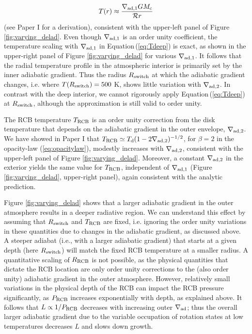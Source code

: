 \documentclass[apj]{emulateapj}
\newcommand{\Eq}[1]{Equation\,(\ref{#1})}
\newcommand{\co}{_{\rm c}}
\newcommand{\di}{_{\rm d}}
\newcommand{\cb}{_{\rm RCB}}
\begin{document}
\begin{equation}
\label{eq:Tdeep}
T(r) \approx \frac{\nabla_{\rm ad,1} G M\co}{\mathcal{R} r}
\end{equation}   
(see Paper I for a derivation), consistent with the upper-left panel of Figure \ref{fig:varying_delad}. Even though $\nabla_{\rm ad,1}$ is an order unity coefficient, the temperature scaling with $\nabla_{\rm ad,1}$ in \Eq{eq:Tdeep} is exact, as shown in the upper-right panel of Figure \ref{fig:varying_delad} for various $\nabla_{\rm ad,1}$. It follows that the radial temperature profile in the atmospheric interior is primarily set by the inner adiabatic gradient. Thus the radius $R_{\rm switch}$ at which the adiabatic gradient changes, i.e. where $T(R_{\rm switch})=500$ K, shows little variation with $\nabla_{\rm ad,2}$. In contrast with the deep interior, we cannot rigorously apply \Eq{eq:Tdeep} at $R_{\rm switch}$, although the approximation is still valid to order unity.

The RCB temperature $T\cb$ is an order unity correction from the disk temperature that depends on the adiabatic gradient in the outer envelope, $\nabla_{\rm ad,2}$.  We have showed in Paper I that $T\cb \simeq T\di (1- 2 \nabla_{\rm ad, 2})^{-1/2}$, for $\beta=2$ in the opacity-law (\ref{eq:opacitylaw}), modestly increases with $\nabla_{\rm ad,2}$, consistent with the upper-left panel of Figure \ref{fig:varying_delad}. Moreover, a constant $\nabla_{\rm ad,2}$ in the exterior yields the same value for $T\cb$, independent of $\nabla_{\rm ad,1}$ (Figure \ref{fig:varying_delad}, upper-right panel), again consistent with the analytic prediction. 

Figure \ref{fig:varying_delad} shows that a larger adiabatic gradient in the outer atmosphere results in a deeper radiative region. We can understand this effect by assuming that $R_{\rm switch}$ and $T\cb$ are fixed, i.e. ignoring the order unity variations in these quantities due to changes in the adiabatic gradient, as discussed above. A steeper adiabat (i.e., with a larger adiabatic gradient) that starts at a given depth (here $R_{\rm switch}$) will match the fixed RCB temperature at a smaller radius. A quantitative scaling of $R\cb$ is not possible, as the physical quantities that dictate the RCB location are only order unity corrections to the (also order unity) adiabatic gradient in the outer atmosphere. However, relatively small variations in the physical depth of the RCB can impact the RCB pressure significantly, as $P\cb$ increases exponentially with depth, as explained above. It follows that $L \propto 1/P\cb$ decreases with increasing outer $\nabla_{\rm ad}$; thus the overall larger adiabatic gradient due to the variable occupation of rotation states at low temperatures decreases $L$ and slows down growth. 
\end{document}
